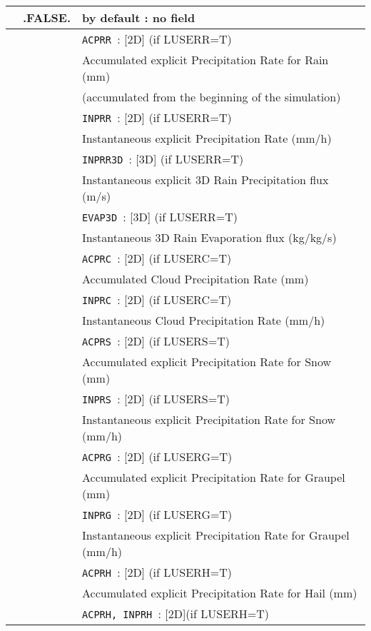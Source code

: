 \begin{center}
\begin{makeimage}
\begin{tabular}{|>{\centering}p{3cm}|>{\centering}p{2.5cm}|p{11cm}|}
\hline
\multirow{35}{*}{LVAR\_PR}\index{LVAR\_PR!\innam{NAM\_DIAG}}&\textbf{.FALSE.} & by default : no field \\\cline{2-3}
&\multirow{34}{*}{.TRUE.} & {\tt ACPRR }: [2D] (if LUSERR=T) \\
&&  Accumulated explicit Precipitation Rate for Rain (mm) \\\cline{3-3}
&&  (accumulated from the beginning of the simulation) \\\cline{3-3}
& &{\tt INPRR }: [2D]  (if LUSERR=T)\\
&&Instantaneous explicit Precipitation Rate (mm/h)\\\cline{3-3}
& & {\tt INPRR3D }: [3D] (if LUSERR=T)\\
&& Instantaneous explicit 3D Rain Precipitation flux (m/s) \\\cline{3-3}
& &{\tt EVAP3D }: [3D] (if LUSERR=T)\\
&& Instantaneous 3D Rain Evaporation flux (kg/kg/s) \\\cline{3-3}
& &{\tt ACPRC }: [2D] (if LUSERC=T)\\
&& Accumulated Cloud Precipitation Rate (mm)\\\cline{3-3}
& &{\tt INPRC }: [2D] (if LUSERC=T)\\
&& Instantaneous Cloud Precipitation Rate (mm/h)\\\cline{3-3}
& &{\tt ACPRS }: [2D] (if LUSERS=T)\\
&& Accumulated explicit Precipitation Rate for Snow (mm) \\\cline{3-3}
& &{\tt INPRS }: [2D] (if LUSERS=T) \\
&& Instantaneous explicit Precipitation Rate for Snow (mm/h)  \\\cline{3-3}
& &{\tt ACPRG }: [2D] (if LUSERG=T)\\
&& Accumulated explicit Precipitation Rate for Graupel (mm) \\\cline{3-3}
& &{\tt INPRG }: [2D] (if LUSERG=T)\\
&& Instantaneous explicit Precipitation Rate for Graupel (mm/h)\\\cline{3-3}
& &{\tt ACPRH }: [2D] (if LUSERH=T)\\
&& Accumulated explicit Precipitation Rate for Hail (mm)\\\cline{3-3}
& &{\tt ACPRH, INPRH }: [2D](if LUSERH=T)\\

\end{tabular}
\end{makeimage}
\end{center}
